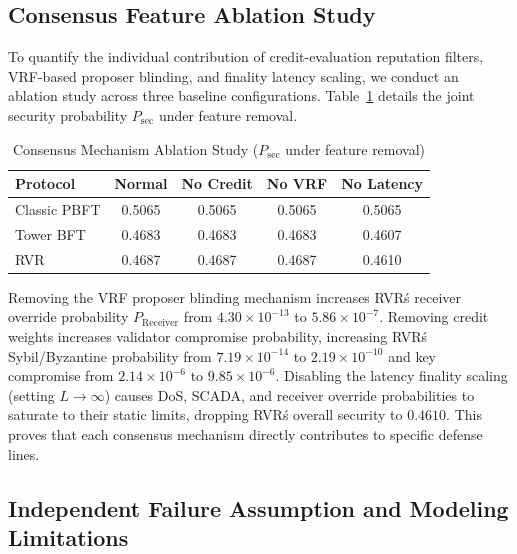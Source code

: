 \documentclass[10pt,twocolumn,journal]{IEEEtran}
\begin{document}
\subsection{Consensus Feature Ablation Study}
\label{sec:ablation_study}

To quantify the individual contribution of credit-evaluation reputation filters, VRF-based proposer blinding, and finality latency scaling, we conduct an ablation study across three baseline configurations. Table~\ref{tab:ablation_study} details the joint security probability $P_{\mathrm{sec}}$ under feature removal.

\begin{table}[t]
\caption{Consensus Mechanism Ablation Study ($P_{\mathrm{sec}}$ under feature removal)}
\label{tab:ablation_study}
\centering
\scriptsize
\begin{tabular}{@{}lcccc@{}}
\toprule
\textbf{Protocol} & \textbf{Normal} & \textbf{No Credit} & \textbf{No VRF} & \textbf{No Latency} \\
\midrule
Classic PBFT & 0.5065 & 0.5065 & 0.5065 & 0.5065 \\
Tower BFT & 0.4683 & 0.4683 & 0.4683 & 0.4607 \\
RVR & 0.4687 & 0.4687 & 0.4687 & 0.4610 \\
\bottomrule
\end{tabular}
\end{table}

Removing the VRF proposer blinding mechanism increases RVR\'s receiver override probability $P_{\mathrm{Receiver}}$ from $4.30 \times 10^{-13}$ to $5.86 \times 10^{-7}$. Removing credit weights increases validator compromise probability, increasing RVR\'s Sybil/Byzantine probability from $7.19 \times 10^{-14}$ to $2.19 \times 10^{-10}$ and key compromise from $2.14 \times 10^{-6}$ to $9.85 \times 10^{-6}$. Disabling the latency finality scaling (setting $L \to \infty$) causes DoS, SCADA, and receiver override probabilities to saturate to their static limits, dropping RVR\'s overall security to $0.4610$. This proves that each consensus mechanism directly contributes to specific defense lines.

\subsection{Independent Failure Assumption and Modeling Limitations}
\label{sec:independence_limitations}
\end{document}
